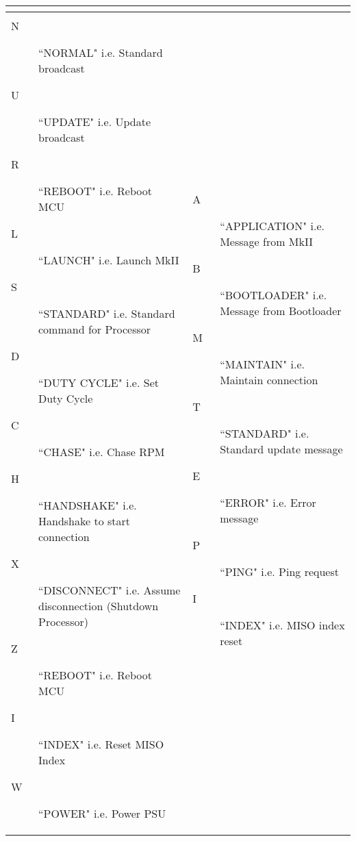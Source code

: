 \documentclass{article}
\begin{document}
\begin{center}
\begin{longtable}{| p{} | p{} |}
\begin{itemize}
	\end{itemize}
	\\
	\hline
	\pagebreak
	\hline
	\multicolumn{2}{|c|}{\textbf{Legend}}\\*
	\hline
	\begin{description}
		\item[N] ``NORMAL" i.e. Standard broadcast
		\item[U] ``UPDATE" i.e. Update broadcast
		\item[R] ``REBOOT" i.e. Reboot MCU
		\item[L] ``LAUNCH" i.e. Launch MkII
		\item[S] ``STANDARD" i.e. Standard command for Processor
		\item[D] ``DUTY CYCLE" i.e. Set Duty Cycle
		\item[C] ``CHASE" i.e. Chase RPM
		\item[H] ``HANDSHAKE" i.e. Handshake to start connection
		\item[X] ``DISCONNECT" i.e. Assume disconnection (Shutdown Processor)
		\item[Z] ``REBOOT" i.e. Reboot MCU
		\item[I] ``INDEX" i.e. Reset MISO Index
		\item[W] ``POWER" i.e. Power PSU
	\end{description}
	&
	\begin{description}
		\item[A] ``APPLICATION" i.e. Message from MkII
		\item[B] ``BOOTLOADER" i.e. Message from Bootloader
		\item[M] ``MAINTAIN" i.e. Maintain connection
		\item[T] ``STANDARD" i.e. Standard update message
		\item[E] ``ERROR" i.e. Error message
		\item[P] ``PING" i.e. Ping request
		\item[I] ``INDEX" i.e. MISO index reset
	\end{description}
	\\
	\hline

\end{longtable}
\end{center}
\end{document}
